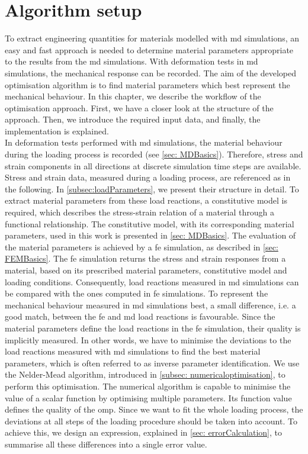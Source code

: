 

\chapter{Algorithm setup} \label{chap:modelsAndMethods}
To extract engineering quantities for materials modelled with \acrshort{md} simulations, an easy and fast approach is needed to determine material parameters appropriate to the results from the \acrshort{md} simulations.
With deformation tests in \acrshort{md} simulations, the mechanical response can be recorded. The aim of the developed optimisation algorithm is to find material parameters which best represent the mechanical behaviour.
In this chapter, we describe the workflow of the optimisation approach. First, we have a closer look at the structure of the approach. Then, we introduce the required input data, and finally, the implementation is explained. \\

In deformation tests performed with \acrshort{md} simulations, the material behaviour during the loading process is recorded (see \autoref{sec: MDBasics}). Therefore, stress and strain components in all directions at discrete simulation time steps are available. Stress and strain data, measured during a loading process, are referenced as  in the following.
In \autoref{subsec:loadParameters}, we present their structure in detail. To extract material parameters from these load reactions, a constitutive model is required, which describes the stress-strain relation of a material through a functional relationship.
The constitutive model, with its corresponding material parameters, used in this work is presented in \autoref{sec: MDBasics}.  
The evaluation of the material parameters is achieved by a \acrshort{fe} simulation, as described in \autoref{sec: FEMBasics}.
The \acrshort{fe} simulation returns the stress and strain responses from a material, based on its prescribed material parameters, constitutive model and loading conditions.
Consequently, load reactions measured in \acrshort{md} simulations can be compared with the ones computed in \acrshort{fe} simulations.
To represent the mechanical behaviour measured in \acrshort{md} simulations best, a small difference, i.e. a good match, between the \acrshort{fe} and \acrshort{md} load reactions is favourable. Since the material parameters define the load reactions in the \acrshort{fe} simulation, their quality is implicitly measured.
In other words, we have to minimise the deviations to the load reactions measured with \acrshort{md} simulations to find the best material parameters, which is often referred to as inverse parameter identification. We use the Nelder-Mead algorithm, introduced in \autoref{subsec: numericaloptimisation}, to perform this optimisation. The numerical algorithm is capable to minimise the value of a scalar function by optimising multiple parameters. 
Its function value defines the quality of the \acrlong{omp}.
Since we want to fit the whole loading process, the deviations at all steps of the loading procedure should be taken into account. To achieve this, we design an expression, explained in \autoref{sec: errorCalculation}, to summarise all these differences into a single error value.


